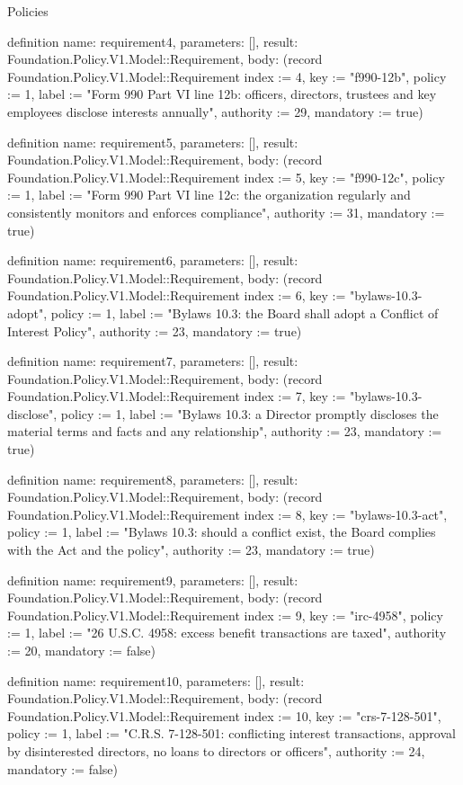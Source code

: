 \begin{lexlean}{Policies}
\begin{semanticmodule}
definition{
  name: requirement4,
  parameters: [],
  result: Foundation.Policy.V1.Model::Requirement,
  body: (record Foundation.Policy.V1.Model::Requirement {index := 4, key := "f990-12b", policy := 1, label := "Form 990 Part VI line 12b: officers, directors, trustees and key employees disclose interests annually", authority := 29, mandatory := true})
}

definition{
  name: requirement5,
  parameters: [],
  result: Foundation.Policy.V1.Model::Requirement,
  body: (record Foundation.Policy.V1.Model::Requirement {index := 5, key := "f990-12c", policy := 1, label := "Form 990 Part VI line 12c: the organization regularly and consistently monitors and enforces compliance", authority := 31, mandatory := true})
}

definition{
  name: requirement6,
  parameters: [],
  result: Foundation.Policy.V1.Model::Requirement,
  body: (record Foundation.Policy.V1.Model::Requirement {index := 6, key := "bylaws-10.3-adopt", policy := 1, label := "Bylaws 10.3: the Board shall adopt a Conflict of Interest Policy", authority := 23, mandatory := true})
}

definition{
  name: requirement7,
  parameters: [],
  result: Foundation.Policy.V1.Model::Requirement,
  body: (record Foundation.Policy.V1.Model::Requirement {index := 7, key := "bylaws-10.3-disclose", policy := 1, label := "Bylaws 10.3: a Director promptly discloses the material terms and facts and any relationship", authority := 23, mandatory := true})
}

definition{
  name: requirement8,
  parameters: [],
  result: Foundation.Policy.V1.Model::Requirement,
  body: (record Foundation.Policy.V1.Model::Requirement {index := 8, key := "bylaws-10.3-act", policy := 1, label := "Bylaws 10.3: should a conflict exist, the Board complies with the Act and the policy", authority := 23, mandatory := true})
}

definition{
  name: requirement9,
  parameters: [],
  result: Foundation.Policy.V1.Model::Requirement,
  body: (record Foundation.Policy.V1.Model::Requirement {index := 9, key := "irc-4958", policy := 1, label := "26 U.S.C. 4958: excess benefit transactions are taxed", authority := 20, mandatory := false})
}

definition{
  name: requirement10,
  parameters: [],
  result: Foundation.Policy.V1.Model::Requirement,
  body: (record Foundation.Policy.V1.Model::Requirement {index := 10, key := "crs-7-128-501", policy := 1, label := "C.R.S. 7-128-501: conflicting interest transactions, approval by disinterested directors, no loans to directors or officers", authority := 24, mandatory := false})
}


\end{semanticmodule}
\end{lexlean}
